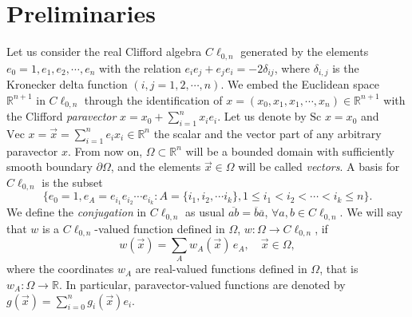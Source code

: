 \documentclass[12pt]{article}
\def\R{\mathbb{R}}
\begin{document}


\section{Preliminaries}\label{subsec:Preliminaries}
Let us consider the real Clifford algebra $C\ell_{0,n}$ generated by the elements $e_0=1,e_1,e_2,\cdots,e_n$ with the relation $e_ie_j+e_je_i=-2\delta_{ij}$, where $\delta_{i,j}$ is the Kronecker delta function $(i,j=1,2,\cdots,n)$. We embed the Euclidean space $\R^{n+1}$ in $C\ell_{0,n}$ through the identification of $x=(x_0,x_1,x_1,\cdots,x_n)\in \R^{n+1}$ with the Clifford \textit{paravector} $x=x_0+\sum_{i=1}^n x_ie_i$. Let us denote by $\text{Sc }x=x_0$ and $\text{Vec }x=\vec x=\sum _{i=1}^n e_ix_i \in \R^n$ the scalar and the vector part of any arbitrary paravector $x$. From now on, $\Omega\subset \R^n$ will be a bounded domain with sufficiently smooth boundary $\partial\Omega$, and the elements $\vec x\in \Omega$ will be called \textit{vectors}.
A basis for $C\ell_{0,n}$ is the subset
\[
  \{e_0=1, e_A=e_{i_1}e_{i_2}\cdots e_{i_k} \colon A=\{i_1,i_2,\cdots i_k\}, 1\leq i_1<i_2<\cdots <i_k\leq n\}.
\]
We define the \textit{conjugation} in $C\ell_{0,n}$ as usual $\overline{ab}=\overline{b}\overline{a}$, $\forall a,b\in C\ell_{0,n}$. We will say that $w$ is a $C\ell_{0,n}$-valued function defined in $\Omega$, $w \colon \Omega \to C\ell_{0,n}$, if
\[ 
w(\vec x)=\sum_A w_A(\vec x)\, e_A, \quad \vec x\in \Omega,
\]
where the coordinates $w_A$ are real-valued functions defined in $\Omega$, that is $w_A\colon \Omega \to \R$. In particular, paravector-valued functions are denoted by $g(\vec x)=\sum_{i=0}^n g_i(\vec x) e_i$. 
\end{document}
